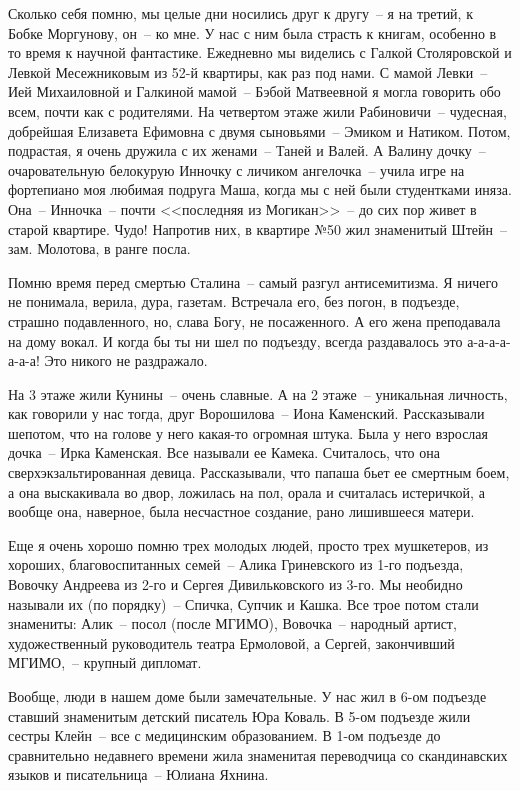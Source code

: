 Сколько себя помню, мы целые дни носились друг к другу~-- я на третий, к Бобке Моргунову, он~-- ко мне. У нас с ним была страсть к книгам, особенно в то время к научной фантастике. Ежедневно мы виделись с Галкой Столяровской и Левкой Месежниковым из 52-й квартиры, как раз под нами. С мамой Левки~-- Ией Михаиловной и Галкиной мамой~-- Бэбой Матвеевной я могла говорить обо всем, почти как с родителями. На четвертом этаже жили Рабиновичи~-- чудесная, добрейшая Елизавета Ефимовна с двумя сыновьями~-- Эмиком и Натиком. Потом, подрастая, я очень дружила с их женами~-- Таней и Валей. А Валину дочку~-- очаровательную белокурую Инночку с личиком ангелочка~-- учила игре на фортепиано моя любимая подруга Маша, когда  мы с ней были студентками иняза. Она~-- Инночка~-- почти <<последняя из Могикан>>~-- до сих пор живет в старой квартире. Чудо! Напротив них, в квартире №50 жил знаменитый Штейн~-- зам. Молотова, в ранге посла.

Помню время перед смертью Сталина~-- самый разгул антисемитизма. Я ничего не понимала, верила, дура, газетам. Встречала его, без погон, в подъезде, страшно подавленного, но, слава Богу, не посаженного. А его жена преподавала на дому вокал. И когда бы ты ни шел по подъезду, всегда раздавалось это а-а-а-а-а-а-а! Это никого не раздражало.

На 3 этаже жили Кунины~-- очень славные. А на 2 этаже~-- уникальная личность, как говорили у нас тогда, друг Ворошилова~-- Иона Каменский. Рассказывали шепотом, что на голове у него какая-то огромная штука. Была у него взрослая дочка~-- Ирка Каменская. Все называли ее Камека. Считалось, что она сверхэкзальтированная девица. Рассказывали, что папаша бьет ее смертным боем, а она выскакивала во двор, ложилась на пол, орала и считалась истеричкой, а вообще она, наверное, была несчастное создание, рано лишившееся матери.

Еще я очень хорошо помню трех молодых людей, просто трех мушкетеров, из хороших, благовоспитанных семей~-- Алика Гриневского из 1-го подъезда, Вовочку Андреева из 2-го и Сергея Дивильковского из 3-го. Мы необидно называли их (по порядку)~-- Спичка, Супчик и Кашка. Все трое потом стали знамениты: Алик~-- посол (после МГИМО), Вовочка~-- народный артист, художественный руководитель театра Ермоловой, а Сергей, закончивший МГИМО,~-- крупный дипломат.

Вообще, люди в нашем доме были замечательные. У нас жил в 6-ом подъезде ставший знаменитым детский писатель Юра Коваль. В 5-ом подъезде жили сестры Клейн~-- все с медицинским образованием. В 1-ом подъезде до сравнительно недавнего времени жила знаменитая переводчица со скандинавских языков и писательница~-- Юлиана Яхнина.

